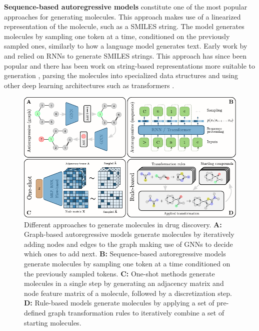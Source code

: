 \textbf{Sequence-based autoregressive models} constitute one of the most popular approaches for
generating molecules. This approach makes use of a linearized representation of the molecule, such
as a SMILES string. The model generates molecules by sampling one token at a time,
conditioned on the previously sampled ones, similarly to how a language model generates text.
Early work by \citep{seglerGeneratingFocusedMolecule2018} and
\citep{gomez-bombarelliAutomaticChemicalDesign2018} relied on \acp{RNN} to
generate SMILES strings. This approach has since been popular and there has been work on
string-based representations more suitable to generation
\citep{oboyleDeepSMILESAdaptationSMILES2018,krennSelfReferencingEmbeddedStrings2020,noutahiGottaBeSAFE2023},
parsing the molecules into specialized data structures
\citep{kusnerGrammarVariationalAutoencoder2017,jinJunctionTreeVariational2018} and using other deep
learning architectures such as transformers
\citep{vaswaniAttentionAllYou2017,noutahiGottaBeSAFE2023,schwallerMolecularTransformerModel2019,bagalMolGPTMolecularGeneration2022,mazuzMoleculeGenerationUsing2023}.

\begin{figure}
      \centering
      \includegraphics[width=\textwidth]{figures/generation_strategies_tryout.pdf}
      \caption{Different approaches to generate molecules in drug discovery. \textbf{A:} Graph-based
            autoregressive models generate molecules by iteratively adding nodes and edges to the
            graph making use of \acp{GNN} to decide which ones to add next. \textbf{B:}
            Sequence-based autoregressive models generate molecules by sampling one token at a time
            conditioned on the previously sampled tokens. \textbf{C:} One-shot methods generate
            molecules in a single step by generating an adjacency matrix and node feature matrix of
            a molecule, followed by a discretization step. \textbf{D:} Rule-based models generate
            molecules by applying a set of pre-defined graph transformation rules to iteratively
            combine a set of starting molecules. \label{fig:generation-strategies}}
\end{figure}

